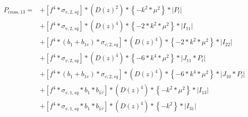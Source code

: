 \documentclass{article}
\begin{document}
\begin{equation}
\begin{aligned} 
P_{\mathrm{cross},13}=
&+\left[f^{4}*\sigma_{v,2,sq}\right]*\left(D(z)^{2}\right)*\left\{-k^{2}*\mu^{2}\right\}*\left|P_l\right| \\
&+\left[f^{4}*\sigma_{v,2,sq}\right]*\left(D(z)^{4}\right)*\left\{-2*k^{2}*\mu^{2}\right\}*\left|I_{11}\right| \\
&+\left[f^{4}*(b_{1}+b_{1v})*\sigma_{v,2,sq}\right]*\left(D(z)^{4}\right)*\left\{-2*k^{2}*\mu^{2}\right\}*\left|I_{22}\right| \\
&+\left[f^{4}*\sigma_{v,2,sq}\right]*\left(D(z)^{4}\right)*\left\{-6*k^{4}*\mu^{2}\right\}*\left|J_{11}*P_l\right| \\
&+\left[f^{4}*(b_{1}+b_{1v})*\sigma_{v,2,sq}\right]*\left(D(z)^{4}\right)*\left\{-6*k^{4}*\mu^{2}\right\}*\left|J_{10}*P_l\right| \\
&+\left[f^{4}*\sigma_{v,1,sq}*b_{1}*b_{1v}\right]*\left(D(z)^{4}\right)*\left\{-k^{2}*\mu^{2}\right\}*\left|I_{13}\right| \\
&+\left[f^{4}*\sigma_{v,1,sq}*b_{1}*b_{1v}\right]*\left(D(z)^{4}\right)*\left\{-k^{2}\right\}*\left|I_{31}\right| \\
\end{aligned}
\end{equation}
\end{document}
